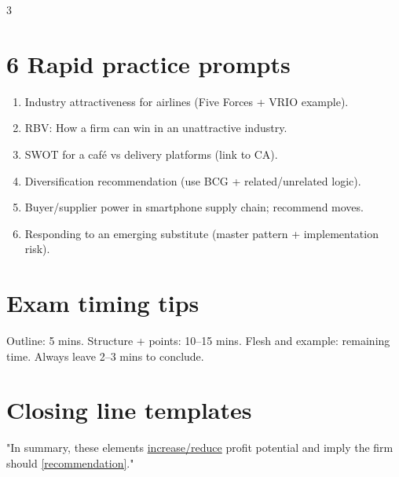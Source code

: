 \documentclass[9pt,landscape,a4paper]{article}
\begin{document}
\begin{multicols}{3}
\section*{6 Rapid practice prompts}
\begin{enumerate}
  \item Industry attractiveness for airlines (Five Forces + VRIO example).
  \item RBV: How a firm can win in an unattractive industry.
  \item SWOT for a café vs delivery platforms (link to CA).
  \item Diversification recommendation (use BCG + related/unrelated logic).
  \item Buyer/supplier power in smartphone supply chain; recommend moves.
  \item Responding to an emerging substitute (master pattern + implementation risk).
\end{enumerate}

\section*{Exam timing tips}
Outline: 5 mins. Structure + points: 10–15 mins. Flesh and example: remaining time. Always leave 2–3 mins to conclude.

\section*{Closing line templates}
"In summary, these elements \underline{increase/reduce} profit potential and imply the firm should \underline{[recommendation]}."

\end{multicols}
\end{document}

